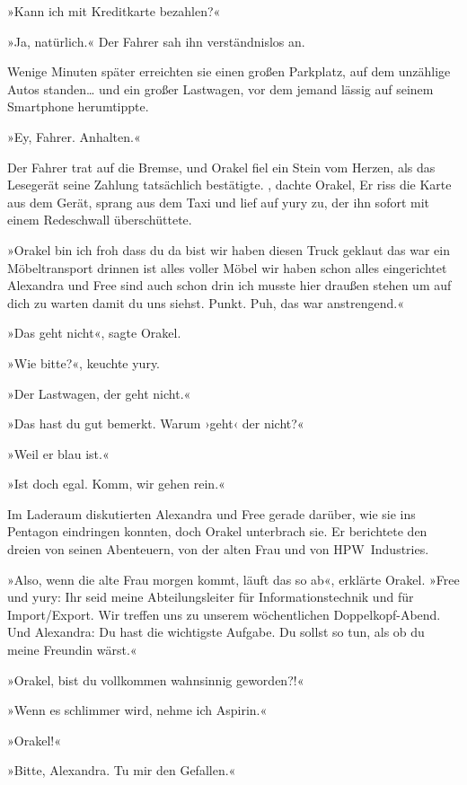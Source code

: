 »Kann ich mit Kreditkarte bezahlen?«

»Ja, natürlich.« Der Fahrer sah ihn verständnislos an.

Wenige Minuten später erreichten sie einen großen Parkplatz, auf dem unzählige Autos standen… und ein großer Lastwagen, vor dem jemand lässig auf seinem Smartphone herumtippte.

»Ey, Fahrer. Anhalten.«

Der Fahrer trat auf die Bremse, und Orakel fiel ein Stein vom Herzen, als das Lesegerät seine Zahlung tatsächlich bestätigte. , dachte Orakel,  Er riss die Karte aus dem Gerät, sprang aus dem Taxi und lief auf yury zu, der ihn sofort mit einem Redeschwall überschüttete.

»Orakel bin ich froh dass du da bist wir haben diesen Truck geklaut das war ein Möbeltransport drinnen ist alles voller Möbel wir haben schon alles eingerichtet Alexandra und Free sind auch schon drin ich musste hier draußen stehen um auf dich zu warten damit du uns siehst. Punkt. Puh, das war anstrengend.«

»Das geht nicht«, sagte Orakel.

»Wie bitte?«, keuchte yury.

»Der Lastwagen, der geht nicht.«

»Das hast du gut bemerkt. Warum ›geht‹ der nicht?«

»Weil er blau ist.«

»Ist doch egal. Komm, wir gehen rein.«

Im Laderaum diskutierten Alexandra und Free gerade darüber, wie sie ins Pentagon eindringen konnten, doch Orakel unterbrach sie. Er berichtete den dreien von seinen Abenteuern, von der alten Frau und von HPW~Industries.

»Also, wenn die alte Frau morgen kommt, läuft das so ab«, erklärte Orakel. »Free und yury: Ihr seid meine Abteilungsleiter für Informationstechnik und für Import/Export. Wir treffen uns zu unserem wöchentlichen Doppelkopf-Abend. Und Alexandra: Du hast die wichtigste Aufgabe. Du sollst so tun, als ob du meine Freundin wärst.«

»Orakel, bist du vollkommen wahnsinnig geworden?!«

»Wenn es schlimmer wird, nehme ich Aspirin.«

»Orakel!«

»Bitte, Alexandra. Tu mir den Gefallen.«

